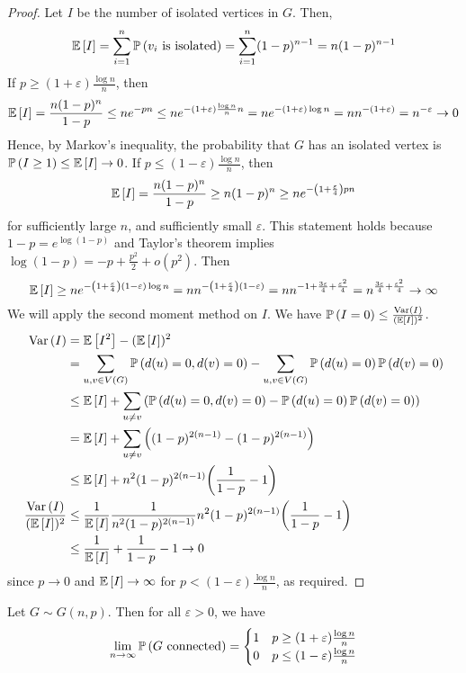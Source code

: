 \begin{proof}
	Let \( I \) be the number of isolated vertices in \( G \).
	Then,
	\[ \mathbb{E}\left[{I}\right] = \sum_{i=1}^n \mathbb{P}\left({v_i \text{ is isolated}}\right) = \sum_{i=1}^n (1-p)^{n-1} = n(1-p)^{n-1} \]
	If \( p \geq (1 + \varepsilon) \frac{\log n}{n} \), then
	\[ \mathbb{E}\left[{I}\right] = \frac{n(1-p)^n}{1-p} \leq ne^{-pn} \leq n e^{-(1+\varepsilon) \frac{\log n}{n} n} = ne^{-(1+\varepsilon) \log n} = n n^{-(1 + \varepsilon)} = n^{-\varepsilon} \to 0 \]
	Hence, by Markov's inequality, the probability that \( G \) has an isolated vertex is \( \mathbb{P}\left({I \geq 1}\right) \leq \mathbb{E}\left[{I}\right] \to 0 \).
	If \( p \leq (1 - \varepsilon) \frac{\log n}{n} \), then
	\[ \mathbb{E}\left[{I}\right] = \frac{n(1-p)^n}{1-p} \geq n(1-p)^n \geq ne^{-\qty(1 + \frac{\varepsilon}{4}) pn} \]
	for sufficiently large \( n \), and sufficiently small \( \varepsilon \).
	This statement holds because \( 1-p = e^{\log(1-p)} \) and Taylor's theorem implies \( \log (1-p) = -p + \frac{p^2}{2} + o(p^2) \).
	Then
	\[ \mathbb{E}\left[{I}\right] \geq ne^{-\qty(1 + \frac{\varepsilon}{4})(1-\varepsilon)\log n} = nn^{-\qty(1 + \frac{\varepsilon}{4})(1-\varepsilon)} = nn^{-1 + \frac{3\varepsilon}{4} + \frac{\varepsilon^2}{4}} = n^{\frac{3\varepsilon}{4} + \frac{\varepsilon^2}{4}} \to \infty \]
	We will apply the second moment method on \( I \).
	We have \( \mathbb{P}\left({I = 0}\right) \leq \frac{\operatorname{Var}\left({I}\right)}{(\mathbb{E}\left[{I}\right])^2} \).
	\begin{align*}
		\operatorname{Var}\left({I}\right) &= \mathbb{E}\left[{I^2}\right] - (\mathbb{E}\left[{I}\right])^2 \\
		&= \sum_{u, v \in V(G)} \mathbb{P}\left({d(u) = 0, d(v) = 0}\right) - \sum_{u,v \in V(G)} \mathbb{P}\left({d(u) = 0}\right) \mathbb{P}\left({d(v) = 0}\right) \\
		&\leq \mathbb{E}\left[{I}\right] + \sum_{u \neq v} \qty( \mathbb{P}\left({d(u) = 0, d(v) = 0}\right) - \mathbb{P}\left({d(u) = 0}\right)\mathbb{P}\left({d(v) = 0}\right) ) \\
		&= \mathbb{E}\left[{I}\right] + \sum_{u \neq v} \qty((1-p)^{2(n-1)} - (1-p)^{2(n-1)}) \\
		&\leq \mathbb{E}\left[{I}\right] + n^2 (1-p)^{2(n-1)} \qty(\frac{1}{1-p} - 1) \\
		\frac{\operatorname{Var}\left({I}\right)}{(\mathbb{E}\left[{I}\right])^2} &\leq \frac{1}{\mathbb{E}\left[{I}\right]} \frac{1}{n^2 (1-p)^{2(n-1)}} n^2 (1-p)^{2(n-1)} \qty(\frac{1}{1-p} - 1) \\
		&\leq \frac{1}{\mathbb{E}\left[{I}\right]} + \frac{1}{1-p} - 1 \to 0
	\end{align*}
	since \( p \to 0 \) and \( \mathbb{E}\left[{I}\right] \to \infty \) for \( p < (1 - \varepsilon) \frac{\log n}{n} \), as required.
\end{proof}
\begin{theorem}
	Let \( G \sim G(n,p) \).
	Then for all \( \varepsilon > 0 \), we have
	\[ \lim_{n \to \infty} \mathbb{P}\left({G \text{ connected}}\right) = \begin{cases}
		1 & p \geq (1 + \varepsilon) \frac{\log n}{n} \\
		0 & p \leq (1 - \varepsilon) \frac{\log n}{n}
	\end{cases} \]
\end{theorem}
